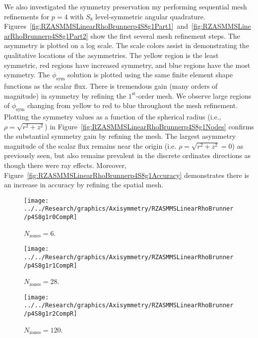 \documentclass[12pt]{article}
\begin{document}
\FloatBarrier

We also investigated the symmetry preservation my performing sequential mesh refinements for $p=4$ with $S_8$ level-symmetric angular quadrature. Figures~\ref{fig:RZASMMSLinearRhoBrunnerp4S8g1Part1}~and~\ref{fig:RZASMMSLinearRhoBrunnerp4S8g1Part2} show the first several mesh refinement steps. The asymmetry is plotted on a log scale. The scale colors assist in demonstrating the qualitative locations of the asymmetries. The yellow region is the least symmetric, red regions have increased symmetry, and blue regions have the most symmetry. The $\phi_\text{sym}$ solution is plotted using the same finite element shape functions as the scalar flux. There is tremendous gain (many orders of magnitude) in symmetry by refining the $1^\text{st}$-order mesh. We observe large regions of $\phi_\text{sym}$ changing from yellow to red to blue throughout the mesh refinement. Plotting the symmetry values as a function of the spherical radius (i.e., $\rho=\sqrt{r^2+z^2}$) in Figure~\ref{fig:RZASMMSLinearRhoBrunnerp4S8g1Nodes} confirms the substantial symmetry gain by refining the mesh. The largest asymmetry magnitude of the scalar flux remains near the origin (i.e. $\rho=\sqrt{r^2+z^2}=0$) as previously seen, but also remains prevalent in the discrete ordinates directions as though there were ray effects. Moreover, Figure~\ref{fig:RZASMMSLinearRhoBrunnerp4S8g1Accuracy} demonstrates there is an increase in accuracy by refining the spatial mesh.

\begin{sidewaysfigure}[!htb]
\centering
\begin{subfigure}{0.33\textwidth}
\texttt{[image: ../../Research/graphics/Axisymmetry/RZASMMSLinearRhoBrunner/p4S8g1r0CompR]}
\caption{$N_\text{zones}=6$.}
\end{subfigure}%
\begin{subfigure}{0.33\textwidth}
\texttt{[image: ../../Research/graphics/Axisymmetry/RZASMMSLinearRhoBrunner/p4S8g1r1CompR]}
\caption{$N_\text{zones}=28$.}
\end{subfigure}%
\begin{subfigure}{0.33\textwidth}
\texttt{[image: ../../Research/graphics/Axisymmetry/RZASMMSLinearRhoBrunner/p4S8g1r2CompR]}
\caption{$N_\text{zones}=120$.}
\end{subfigure}
\caption{Relative asymmetry for $p=4$ finite elements on a $1^\text{st}$-order mesh for $S_8$ level-symmetric angular quadrature for $N_\text{zones}=\{6,28,120\}$.}
\label{fig:RZASMMSLinearRhoBrunnerp4S8g1Part1}
\end{sidewaysfigure}
\end{document}
